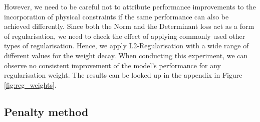 \indent However, we need to be careful not to attribute performance improvements to the incorporation of physical constraints if the same performance can also be achieved differently. Since both the Norm and the Determinant loss act as a form of regularisation, we need to check the effect of applying commonly used other types of regularisation. Hence, we apply L2-Regularisation with a wide range of different values for the weight decay. When conducting this experiment, we can observe no consistent improvement of the model's performance for any regularisation weight. The results can be looked up in the appendix in Figure \ref{fig:reg_weights}.

\subsection{Penalty method}
